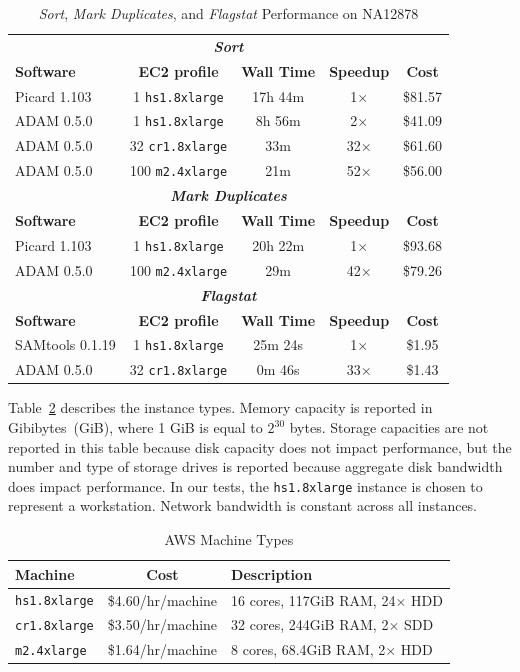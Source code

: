 \documentclass{acm_proc_article-sp}
\begin{document}
\begin{table}[h]
\caption{\textit{Sort}, \textit{Mark Duplicates}, and \textit{Flagstat} Performance on NA12878}
\label{tab:overview}
\begin{tabular}{ l c c c c }
\hline
\multicolumn{5}{c}{\bf \textit{Sort}} \\
\bf Software & \bf EC2 profile & \bf Wall Time & \bf Speedup & \bf Cost \\
\hline
Picard 1.103 & 1 \texttt{hs1.8xlarge} & 17h 44m & 1$\times$ & \$81.57 \\
ADAM 0.5.0 & 1 \texttt{hs1.8xlarge} & 8h 56m & 2$\times$ & \$41.09 \\
ADAM 0.5.0 & 32 \texttt{cr1.8xlarge} & 33m & 32$\times$ & \$61.60 \\
ADAM 0.5.0 & 100 \texttt{m2.4xlarge} & 21m & 52$\times$ & \$56.00 \\ 
\hline
\multicolumn{5}{c}{\bf \textit{Mark Duplicates}} \\
\bf Software & \bf EC2 profile & \bf Wall Time & \bf Speedup & \bf Cost  \\
\hline
Picard 1.103 & 1 \texttt{hs1.8xlarge} & 20h 22m & 1$\times$ & \$93.68 \\
ADAM 0.5.0 & 100 \texttt{m2.4xlarge} & 29m & 42$\times$ & \$79.26 \\
\hline
\multicolumn{5}{c}{\bf \textit{Flagstat}} \\
\bf Software & \bf EC2 profile & \bf Wall Time & \bf Speedup & \bf Cost  \\
\hline
SAMtools 0.1.19 & 1 \texttt{hs1.8xlarge} & 25m 24s & 1$\times$ & \$1.95 \\
ADAM 0.5.0 & 32 \texttt{cr1.8xlarge} & 0m 46s & 33$\times$ & \$1.43 \\
\hline
\end{tabular}
\end{table}

Table~\ref{tab:machines} describes the instance types. Memory capacity is reported in Gibibytes~(GiB),
where 1 GiB is equal to $2^{30}$ bytes. Storage capacities are not reported in this table because disk
capacity does not impact performance, but the number and type of storage drives is reported because
aggregate disk bandwidth does impact performance. In our tests, the \texttt{hs1.8xlarge} instance is
chosen to represent a workstation. Network bandwidth is constant across all instances.

\begin{table}[h]
\caption{AWS Machine Types}
\label{tab:machines}
\begin{tabular}{ l c l }
\hline
\bf Machine & \bf Cost & \bf Description \\
\hline
\hline
\texttt{hs1.8xlarge} & \$4.60/hr/machine & 16 cores, 117GiB RAM, 24$\times$ HDD \\
\texttt{cr1.8xlarge} & \$3.50/hr/machine & 32 cores, 244GiB RAM, 2$\times$ SDD \\
\texttt{m2.4xlarge} & \$1.64/hr/machine & 8 cores, 68.4GiB RAM, 2$\times$ HDD \\
\hline
\end{tabular}
\end{table}
\end{document}
